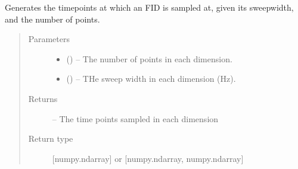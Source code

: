 \documentclass[letterpaper,10pt,english]{sphinxmanual}
\begin{document}
\begin{fulllineitems}
\label{\detokenize{references/sig:nmrespy.sig.get_timepoints}}
\sphinxAtStartPar
Generates the timepoints at which an FID is sampled at, given
its sweep\sphinxhyphen{}width, and the number of points.
\begin{quote}\begin{description}
\item[{Parameters}] \leavevmode\begin{itemize}
\item {} 
\sphinxAtStartPar
{} (\sphinxstyleliteralemphasis{\sphinxupquote{{[}}}\sphinxstyleliteralemphasis{\sphinxupquote{{]} or }}\sphinxstyleliteralemphasis{\sphinxupquote{{[}}}\sphinxstyleliteralemphasis{\sphinxupquote{, }}\sphinxstyleliteralemphasis{\sphinxupquote{{]}}}) – The number of points in each dimension.

\item {} 
\sphinxAtStartPar
{} (\sphinxstyleliteralemphasis{\sphinxupquote{{[}}}\sphinxstyleliteralemphasis{\sphinxupquote{{]} or }}\sphinxstyleliteralemphasis{\sphinxupquote{{[}}}\sphinxstyleliteralemphasis{\sphinxupquote{, }}\sphinxstyleliteralemphasis{\sphinxupquote{{]}}}) – THe sweep width in each dimension (Hz).

\end{itemize}

\item[{Returns}] \leavevmode
\sphinxAtStartPar
{} – The time points sampled in each dimension

\item[{Return type}] \leavevmode
\sphinxAtStartPar
{[}numpy.ndarray{]} or {[}numpy.ndarray, numpy.ndarray{]}

\end{description}\end{quote}

\end{fulllineitems}

\end{document}
